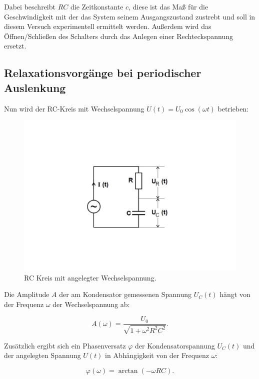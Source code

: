 Dabei beschreibt $RC$ die Zeitkonstante $c$, diese ist das Maß für die Geschwindigkeit mit der das System seinem
Ausgangszustand zustrebt und soll in diesem Versuch experimentell ermittelt werden.
Außerdem wird das Öffnen/Schließen des Schalters durch das Anlegen einer Rechteckspannung ersetzt.

\subsection{Relaxationsvorgänge bei periodischer Auslenkung}
Nun wird der RC-Kreis mit Wechselspannung $U(t) = U_{0}\cos(\omega t)$ betrieben:
\begin{figure}
    \centering
    \includegraphics{content/Theorie - RC-Kreis Wechselspannung.pdf}
    \caption{RC Kreis mit angelegter Wechselspannung. \cite{v353}}
    \label{fig:Theorie - RC_Kreis Wechselspannung}
\end{figure}

Die Amplitude $A$ der am Kondensator gemessenen Spannung $U_{C}(t)$ hängt von der Frequenz $\omega$ der Wechselspannung ab:

\begin{equation}
    A(\omega)= \frac{U_{0}}{\sqrt{1+\omega ^{2}R^{2}C^{2}}} . \label{eqn:Tiefpass}
\end{equation}

Zusätzlich ergibt sich ein Phasenversatz $\varphi$ der Kondensatorspannung $U_{C}(t)$ und der angelegten Spannung $U(t)$
in Abhängigkeit von der Frequenz $\omega$:

\begin{equation}
    \varphi (\omega )=\arctan (-\omega RC). \label{eqn:Phasenversatz}
\end{equation}

